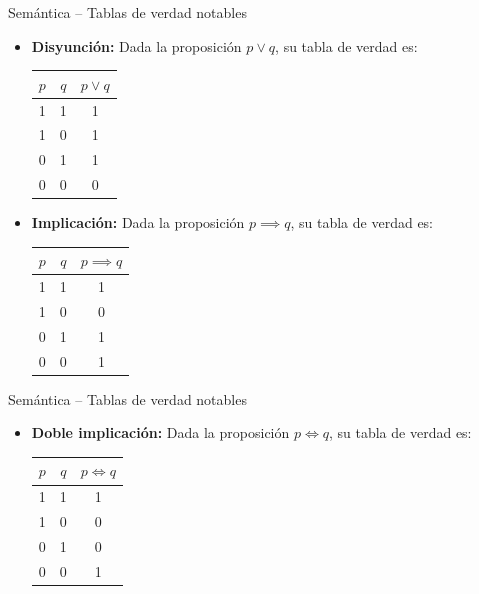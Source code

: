 \documentclass[dvisvgm,hypertex,aspectratio=169]{beamer}
\begin{document}
\begin{frame}{Semántica -- Tablas de verdad notables}
  \begin{itemize}[<+->]
    \item \textbf{Disyunción:} Dada la proposición $p \lor q$, su tabla de verdad es:
    \begin{table}[h]
      \centering
      \begin{tabular}{|c|c|c|}
        \hline
        $p$ & $q$ & $p \lor q$ \\ \hline
        1 & 1 & 1 \\ \hline
        1 & 0 & 1 \\ \hline
        0 & 1 & 1 \\ \hline
        0 & 0 & 0 \\ \hline
      \end{tabular}
    \end{table}
    \item \textbf{Implicación:} Dada la proposición $p \implies q$, su tabla de verdad es:
    \begin{table}[h]
      \centering
      \begin{tabular}{|c|c|c|}
        \hline
        $p$ & $q$ & $p \implies q$ \\ \hline
        1 & 1 & 1 \\ \hline
        1 & 0 & 0 \\ \hline
        0 & 1 & 1 \\ \hline
        0 & 0 & 1 \\ \hline
      \end{tabular}
    \end{table}
  \end{itemize}
\end{frame}
\begin{frame}{Semántica -- Tablas de verdad notables}
  \begin{itemize}[<+->]
    \item \textbf{Doble implicación:} Dada la proposición $p \iff q$, su tabla de verdad es:
    \begin{table}[h]
      \centering
      \begin{tabular}{|c|c|c|}
        \hline
        $p$ & $q$ & $p \iff q$ \\ \hline
        1 & 1 & 1 \\ \hline
        1 & 0 & 0 \\ \hline
        0 & 1 & 0 \\ \hline
        0 & 0 & 1 \\ \hline
      \end{tabular}
    \end{table}
  \end{itemize}
\end{frame}
\end{document}
